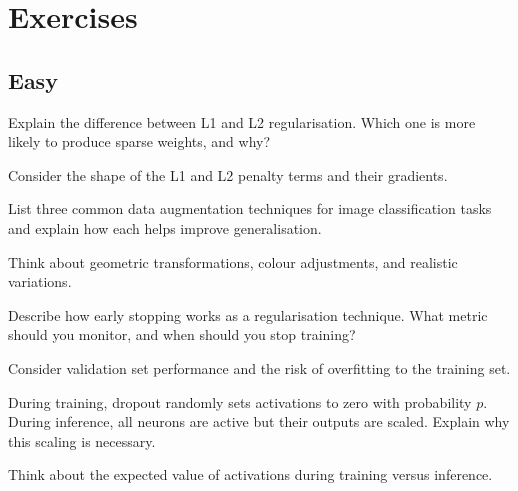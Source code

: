 
\section*{Exercises}

\subsection*{Easy}

\begin{exercisebox}[easy]
\begin{problem}[L1 vs L2 Regularisation]
Explain the difference between L1 and L2 regularisation. Which one is more likely to produce sparse weights, and why?
\end{problem}
\begin{hintbox}
Consider the shape of the L1 and L2 penalty terms and their gradients.
\end{hintbox}
\end{exercisebox}


\begin{exercisebox}[easy]
\begin{problem}
List three common data augmentation techniques for image classification tasks and explain how each helps improve generalisation.
\end{problem}
\begin{hintbox}
Think about geometric transformations, colour adjustments, and realistic variations.
\end{hintbox}
\end{exercisebox}


\begin{exercisebox}[easy]
\begin{problem}
Describe how early stopping works as a regularisation technique. What metric should you monitor, and when should you stop training?
\end{problem}
\begin{hintbox}
Consider validation set performance and the risk of overfitting to the training set.
\end{hintbox}
\end{exercisebox}


\begin{exercisebox}[easy]
\begin{problem}
During training, dropout randomly sets activations to zero with probability $p$. During inference, all neurons are active but their outputs are scaled. Explain why this scaling is necessary.
\end{problem}
\begin{hintbox}
Think about the expected value of activations during training versus inference.
\end{hintbox}
\end{exercisebox}


